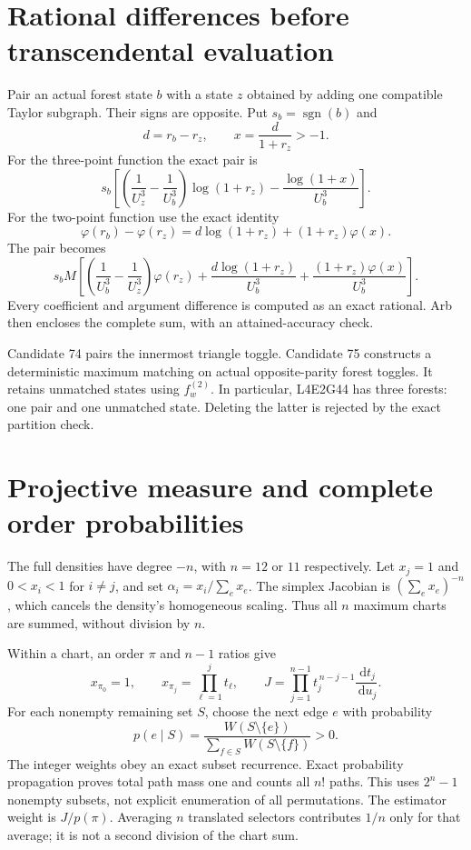 \documentclass[11pt]{article}
\newcommand{\ph}{\varphi}
\newcommand{\dd}{\,\mathrm{d}}
\begin{document}
\section{Rational differences before transcendental evaluation}
Pair an actual forest state $b$ with a state $z$ obtained by adding
one compatible Taylor subgraph. Their signs are opposite. Put
$s_b=\operatorname{sgn}(b)$ and
\[
 d=r_b-r_z,\qquad x=\frac{d}{1+r_z}>-1.
\]
For the three-point function the exact pair is
\[
 s_b\left[
 \left(\frac1{U_z^3}-\frac1{U_b^3}\right)\log(1+r_z)
 -\frac{\log(1+x)}{U_b^3}\right].
\]
For the two-point function use the exact identity
\[
 \ph(r_b)-\ph(r_z)=d\log(1+r_z)+(1+r_z)\ph(x).
\]
The pair becomes
\[
 s_b M\left[
 \left(\frac1{U_b^3}-\frac1{U_z^3}\right)\ph(r_z)
 +\frac{d\log(1+r_z)}{U_b^3}
 +\frac{(1+r_z)\ph(x)}{U_b^3}\right].
\]
Every coefficient and argument difference is computed as an exact rational.
Arb then encloses the complete sum, with an attained-accuracy check.

Candidate 74 pairs the innermost triangle toggle. Candidate 75 constructs
a deterministic maximum matching on actual opposite-parity forest toggles.
It retains unmatched states using $f_w^{(2)}$.
In particular, L4E2G44 has three forests: one pair and one unmatched state.
Deleting the latter is rejected by the exact partition check.

\section{Projective measure and complete order probabilities}
The full densities have degree $-n$, with $n=12$ or $11$ respectively.
Let $x_j=1$ and $0<x_i<1$ for $i\ne j$, and set
$\alpha_i=x_i/\sum_e x_e$. The simplex Jacobian is $(\sum_e x_e)^{-n}$,
which cancels the density's homogeneous scaling. Thus all $n$ maximum charts
are summed, without division by $n$.

Within a chart, an order $\pi$ and $n-1$ ratios give
\[
 x_{\pi_0}=1,\qquad
 x_{\pi_j}=\prod_{\ell=1}^j t_\ell,\qquad
 J=\prod_{j=1}^{n-1} t_j^{\,n-j-1}\frac{\dd t_j}{\dd u_j}.
\]
For each nonempty remaining set $S$, choose the next edge $e$ with probability
\[
 p(e\mid S)=\frac{W(S\setminus\{e\})}
                  {\sum_{f\in S}W(S\setminus\{f\})}>0.
\]
The integer weights obey an exact subset recurrence. Exact probability
propagation proves total path mass one and counts all $n!$ paths.
This uses $2^n-1$ nonempty subsets, not explicit enumeration of all permutations.
The estimator weight is $J/p(\pi)$.
Averaging $n$ translated selectors contributes $1/n$ only for that average;
it is not a second division of the chart sum.
\end{document}
